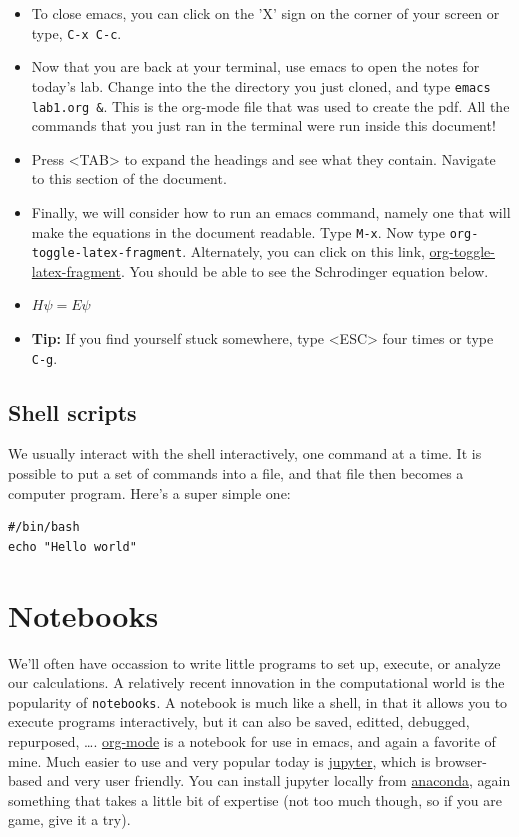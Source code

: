 \documentclass[11pt]{article}
\begin{document}
\begin{itemize}
\item To close emacs, you can click on the 'X' sign on the corner of your screen or type, \texttt{C-x C-c}.

\item Now that you are back at your terminal, use emacs to open the notes for today's lab. Change into the the directory you just cloned, and type \texttt{emacs lab1.org \&}. This is the org-mode file that was used to create the pdf. All the commands that you just ran in the terminal were run inside this document!

\item Press <TAB> to expand the headings and see what they contain. Navigate to this section of the document.

\item Finally, we will consider how to run an emacs command, namely one that will make the equations in the document readable. Type \texttt{M-x}. Now type \texttt{org-toggle-latex-fragment}. Alternately, you can click on this link, \url{org-toggle-latex-fragment}. You should be able to see the Schrodinger equation below.

\item \(H\psi = E\psi\)

\item \textbf{Tip:} If you find yourself stuck somewhere, type <ESC> four times or type \texttt{C-g}.
\end{itemize}

\subsection{Shell scripts}
\label{sec:org583519b}
We usually interact with the shell interactively, one command at a time.  It is possible
to put a set of commands into a file, and that file then becomes a computer program.
Here's a super simple one:

\begin{verbatim}
#/bin/bash
echo "Hello world"
\end{verbatim}

\section{Notebooks}
\label{sec:org4a886f8}
We'll often have occassion to write little programs to set up, execute, or analyze our
calculations.  A relatively recent innovation in the computational world is the popularity
of \texttt{notebooks}. A notebook is much like a shell, in that it allows you to execute programs
interactively, but it can also be saved, editted, debugged, repurposed, \ldots{}.  \href{https://orgmode.org/}{org-mode} is
a notebook for use in emacs, and again a favorite of mine.  Much easier to use and very
popular today is \href{https://jupyter.org/}{jupyter}, which is browser-based and very user friendly.  You can install
jupyter locally from \href{https://www.anaconda.com/distribution/}{anaconda}, again something that takes a little bit of expertise (not
too much though, so if you are game, give it a try).
\end{document}
